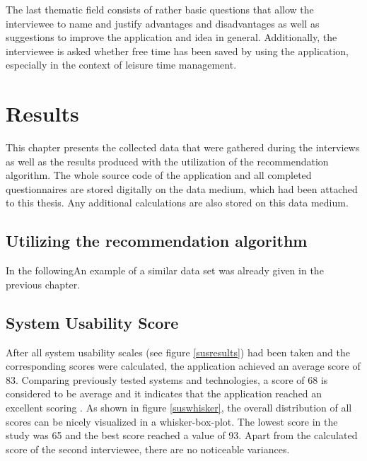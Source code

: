 \documentclass[12pt,numbers=noenddot,parskip,bibliography=totocnumbered,listof=totocnumbered,draft]{scrreprt}
\begin{document}
The last thematic field consists of rather basic questions that allow the interviewee to name and justify advantages and disadvantages as well as suggestions to improve the application and idea in general. Additionally, the interviewee is asked whether free time has been saved by using the application, especially in the context of leisure time management.

\chapter{Results}
This chapter presents the collected data that were gathered during the interviews as well as the results produced with the utilization of the recommendation algorithm. The whole source code of the application and all completed questionnaires are stored digitally on the data medium, which had been attached to this thesis. Any additional calculations are also stored on this data medium.

\section{Utilizing the recommendation algorithm}
In the followingAn example of a similar data set was already given in the previous chapter. 

\section{System Usability Score}
After all system usability scales (see figure \ref{susresults}) had been taken and the corresponding scores were calculated, the application achieved an average score of 83. Comparing previously tested systems and technologies, a score of 68 is considered to be average and it indicates that the application reached an excellent scoring \citep[p. 36]{brooke2013}. As shown in figure \ref{suswhisker}, the overall distribution of all scores can be nicely visualized in a whisker-box-plot. The lowest score in the study was 65 and the best score reached a value of 93. Apart from the calculated score of the second interviewee, there are no noticeable variances.
\end{document}
